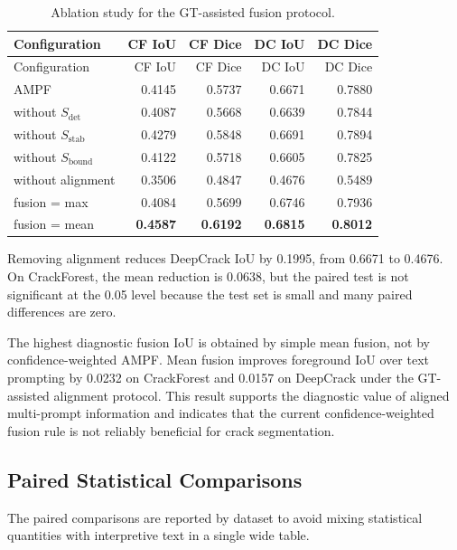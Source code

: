 \documentclass[applsci,article,submit,pdftex,moreauthors]{Definitions/mdpi}
\begin{document}
\begin{longtable}[]{@{}lrrrr@{}}
\caption{Ablation study for the GT-assisted fusion
protocol.}\tabularnewline
\toprule\noalign{}
Configuration & CF IoU & CF Dice & DC IoU & DC Dice \\
\midrule\noalign{}
\endfirsthead
\toprule\noalign{}
Configuration & CF IoU & CF Dice & DC IoU & DC Dice \\
\midrule\noalign{}
\endhead
\bottomrule\noalign{}
\endlastfoot
AMPF & 0.4145 & 0.5737 & 0.6671 & 0.7880 \\
without \(S_{\text{det}}\) & 0.4087 & 0.5668 & 0.6639 & 0.7844 \\
without \(S_{\text{stab}}\) & 0.4279 & 0.5848 & 0.6691 & 0.7894 \\
without \(S_{\text{bound}}\) & 0.4122 & 0.5718 & 0.6605 & 0.7825 \\
without alignment & 0.3506 & 0.4847 & 0.4676 & 0.5489 \\
fusion = max & 0.4084 & 0.5699 & 0.6746 & 0.7936 \\
fusion = mean & \textbf{0.4587} & \textbf{0.6192} & \textbf{0.6815} &
\textbf{0.8012} \\
\end{longtable}

Removing alignment reduces DeepCrack IoU by 0.1995, from 0.6671 to
0.4676. On CrackForest, the mean reduction is 0.0638, but the paired
test is not significant at the 0.05 level because the test set is small
and many paired differences are zero.

The highest diagnostic fusion IoU is obtained by simple mean fusion, not
by confidence-weighted AMPF. Mean fusion improves foreground IoU over
text prompting by 0.0232 on CrackForest and 0.0157 on DeepCrack under
the GT-assisted alignment protocol. This result supports the diagnostic
value of aligned multi-prompt information and indicates that the current
confidence-weighted fusion rule is not reliably beneficial for crack
segmentation.

\subsection{Paired Statistical Comparisons}

The paired comparisons are reported by dataset to avoid mixing
statistical quantities with interpretive text in a single wide table.
\end{document}

